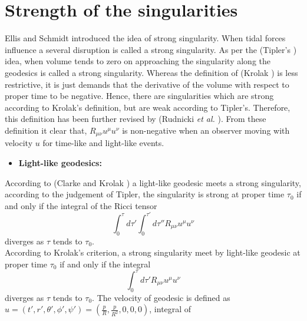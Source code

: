 \documentclass[11pt]{article}
\theoremstyle{theorem}
\theoremstyle{defi}
\begin{document}
\section{Strength of the singularities}
Ellis and Schmidt \cite{40} introduced the idea of strong singularity. When tidal forces influence a several disruption is called a strong singularity. As per the (Tipler's \cite{41}) idea, when volume tends to zero on approaching the singularity along the geodesics is called a strong singularity.
Whereas the definition of (Krolak \cite{42}) is less restrictive, it is just demands that the derivative of the volume with respect to proper time to be negative. Hence,
there are singularities which are strong according to Krolak's definition, but are weak according to Tipler's. Therefore, this definition has been further
revised by (Rudnicki \emph{et al.} \cite{43}). From these definition it clear that, $R_{\mu\nu}u^{\mu}u^{\nu}$ is non-negative when an observer moving with velocity $u$ for time-like and light-like events. 
\begin{itemize}
\item \textbf{Light-like geodesics:}
\end{itemize}
According to (Clarke and Krolak \cite{44}) a light-like geodesic meets a strong singularity, according to the judgement of Tipler, the singularity is strong at proper time $\tau_0$ if and only if the integral
of the Ricci tensor \\
\begin{equation}
\label{eqn37}
\int_0^{\tau}d\tau'\int_0^{\tau'}d\tau''R_{\mu\nu}u^{\mu}u^{\nu}
\end{equation}
diverges as $\tau$ tends to $\tau_0$. \\
According to Krolak's criterion, a strong singularity meet by light-like geodesic at proper time $\tau_0$ if and only if
the integral
\begin{equation}
\label{eqn38}
\int_0^{\tau}d\tau'R_{\mu\nu}u^{\mu}u^{\nu}
\end{equation}
diverges as $\tau$ tends to $\tau_0$. The velocity of geodesic is defined as $u=(t', r', \theta', \phi', \psi')=\left(\frac{p}{R}, \frac{p}{R^2}, 0, 0, 0\right)$, integral of
\end{document}

